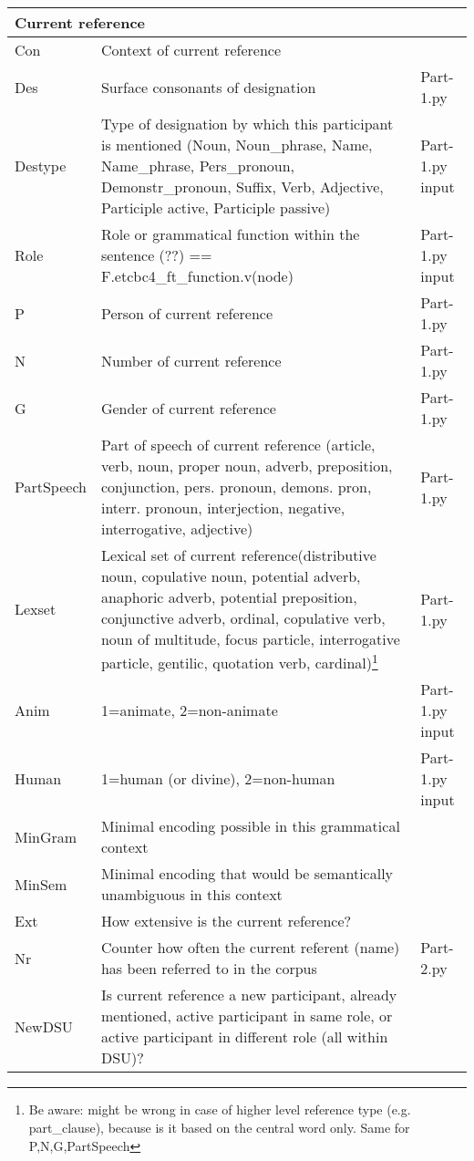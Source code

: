 \documentclass{article}
\begin{document}
\begin{longtable}{|l|p{}|l|}
\multicolumn{3}{|l|}{\bf{Current reference}} \\ \hline

Con & Context of current reference & \\ \hline
Des & Surface consonants of designation & Part-1.py \\ \hline
Destype & Type of designation by which this participant is mentioned (Noun, Noun\_phrase, Name, Name\_phrase, Pers\_pronoun, Demonstr\_pronoun,  Suffix, Verb, Adjective, Participle active, Participle passive) & Part-1.py input \\ \hline
Role & Role or grammatical function within the sentence (??) == F.etcbc4\_ft\_function.v(node) & Part-1.py input\\ \hline
P & Person of current reference & Part-1.py \\ \hline
N & Number of current reference & Part-1.py \\ \hline
G & Gender of current reference & Part-1.py \\ \hline
PartSpeech & Part of speech of current reference (article, verb, noun, proper noun, adverb, preposition, conjunction, pers. pronoun, demons. pron, interr. pronoun, interjection, negative, interrogative, adjective) & Part-1.py \\ \hline
Lexset & Lexical set of current reference(distributive noun, copulative noun, potential adverb, anaphoric adverb, potential preposition, conjunctive adverb, ordinal, copulative verb, noun of multitude, focus particle, interrogative particle, gentilic, quotation verb, cardinal)\footnote{Be aware: might be wrong in case of higher level reference type (e.g. part\_clause), because is it based on the central word only. Same for P,N,G,PartSpeech} & Part-1.py \\ \hline
Anim & 1=animate, 2=non-animate & Part-1.py input \\ \hline
Human & 1=human (or divine), 2=non-human & Part-1.py input \\ \hline
MinGram & Minimal encoding possible in this grammatical context & \\ \hline
MinSem & Minimal encoding that would be semantically unambiguous in this context & \\ \hline
Ext & How extensive is the current reference? & \\ \hline
Nr & Counter how often the current referent (name) has been referred to in the corpus & Part-2.py \\ \hline
NewDSU & Is current reference a new participant, already mentioned, active participant in same role, or active participant in different role (all within DSU)?  & \\ \hline

\end{longtable}
\end{document}
